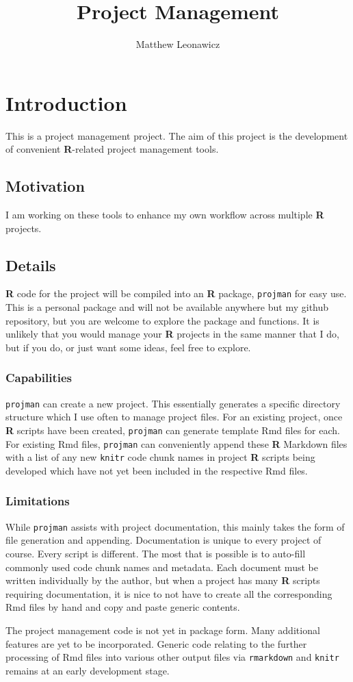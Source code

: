 \documentclass{article}\usepackage[]{graphicx}\usepackage[]{color}
\begin{document}
\title{Project Management}
\author{Matthew Leonawicz}
\maketitle



\section{Introduction}
This is a project management project.
The aim of this project is the development of convenient \textbf{R}-related project management tools.

\subsection{Motivation}
I am working on these tools to enhance my own workflow across multiple \textbf{R} projects.

\subsection{Details}
\textbf{R} code for the project will be compiled into an \textbf{R} package, \texttt{projman} for easy use.
This is a personal package and will not be available anywhere but my github repository,
but you are welcome to explore the package and functions.
It is unlikely that you would manage your \textbf{R} projects in the same manner that I do,
but if you do, or just want some ideas, feel free to explore.

\subsubsection{Capabilities}
\texttt{projman} can create a new project. This essentially generates a specific directory structure which I use often to manage project files.
For an existing project, once \textbf{R} scripts have been created, \texttt{projman} can generate template Rmd files for each.
For existing Rmd files, \texttt{projman} can conveniently append these \textbf{R} Markdown files with a list of any new \texttt{knitr} code chunk names
in project \textbf{R} scripts being developed which have not yet been included in the respective Rmd files.

\subsubsection{Limitations}
While \texttt{projman} assists with project documentation, this mainly takes the form of file generation and appending.
Documentation is unique to every project of course. Every script is different.
The most that is possible is to auto-fill commonly used code chunk names and metadata.
Each document must be written individually by the author, but when a project has many \textbf{R} scripts requiring documentation,
it is nice to not have to create all the corresponding Rmd files by hand and copy and paste generic contents.

The project management code is not yet in package form.
Many additional features are yet to be incorporated.
Generic code relating to the further processing of Rmd files into various other output files via \texttt{rmarkdown} and \texttt{knitr} remains at an early development stage.
\end{document}

